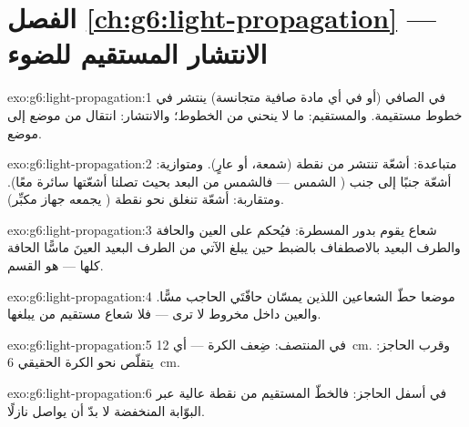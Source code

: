 \section*{الفصل \ref{ch:g6:light-propagation} --- الانتشار المستقيم للضوء}

\begin{solution}{exo:g6:light-propagation:1}
في  الصافي (أو في أي مادة صافية متجانسة) ينتشر  في
خطوط مستقيمة. والمستقيم: ما لا ينحني من الخطوط؛ والانتشار:
انتقال  من موضع إلى موضع.
\end{solution}

\begin{solution}{exo:g6:light-propagation:2}
متباعدة: أشعّة تنتشر من نقطة (شمعة، أو  عارٍ). ومتوازية:
أشعّة جنبًا إلى جنب ( الشمس --- فالشمس من البعد بحيث تصلنا
أشعّتها سائرة معًا). ومتقاربة: أشعّة تنغلق نحو نقطة ( يجمعه
جهاز مكبِّر).
\end{solution}

\begin{solution}{exo:g6:light-propagation:3}
شعاع  يقوم بدور المسطرة: فيُحكم على العين والحافة والطرف
البعيد بالاصطفاف بالضبط حين يبلغ  الآتي من الطرف البعيد
العينَ ماسًّا الحافة كلها ---  هو القسم.
\end{solution}

\begin{solution}{exo:g6:light-propagation:4}
موضعا حطّ الشعاعين اللذين يمسّان حافّتَي الحاجب مسًّا. والعين
داخل مخروط  لا ترى  --- فلا شعاع مستقيم من 
يبلغها.
\end{solution}

\begin{solution}{exo:g6:light-propagation:5}
في المنتصف:  ضِعف الكرة --- أي \qty{12}{cm}. وقرب الحاجز:
يتقلّص  نحو  الكرة الحقيقي \qty{6}{cm}.
\end{solution}

\begin{solution}{exo:g6:light-propagation:6}
في أسفل الحاجز: فالخطّ المستقيم من نقطة عالية عبر البوّابة
المنخفضة لا بدّ أن يواصل نازلًا.
\end{solution}

